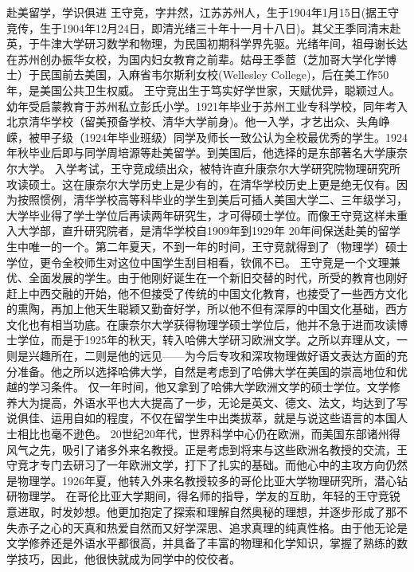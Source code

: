 赴美留学，学识俱进
王守竞，字井然，江苏苏州人，生于1904年1月15日(据王守竞传，生于1904年12月24日，即清光绪三十年十一月十八日)。其父王季同清末赴英，于牛津大学研习数学和物理，为民国初期科学界先驱。光绪年间，祖母谢长达在苏州创办振华女校，为国内妇女教育之前辈。姑母王季茝（芝加哥大学化学博士）于民国前去美国，入麻省韦尔斯利女校(Wellesley College)，后在美工作50年，是美国公共卫生权威。
王守竞出生于笃实好学世家，天赋优异，聪颖过人。幼年受启蒙教育于苏州私立彭氏小学。1921年毕业于苏州工业专科学校，同年考入北京清华学校（留美预备学校、清华大学前身)。他一入学，才艺出众、头角峥嵘，被甲子级（1924年毕业班级）同学及师长一致公认为全校最优秀的学生。1924年秋毕业后即与同学周培源等赴美留学。到美国后，他选择的是东部著名大学康奈尔大学。
入学考试，王守竞成绩出众，被特许直升康奈尔大学研究院物理研究所攻读硕士。这在康奈尔大学历史上是少有的，在清华学校历史上更是绝无仅有。因为按照惯例，清华学校高等科毕业的学生到美后可插人美国大学二、三年级学习，大学毕业得了学士学位后再读两年研究生，才可得硕士学位。而像王守竞这样未重入大学部，直升研究院者，是清华学校自1909年到1929年 20年间保送赴美的留学生中唯一的一个。第二年夏天，不到一年的时间，王守竞就得到了（物理学）硕士学位，更令全校师生对这位中国学生刮目相看，钦佩不已。
王守竞是一个文理兼优、全面发展的学生。由于他刚好诞生在一个新旧交替的时代，所受的教育也刚好赶上中西交融的开始，他不但接受了传统的中国文化教育，也接受了一些西方文化的熏陶，再加上他天生聪颖又勤奋好学，所以他不但有深厚的中国文化基础，西方文化也有相当功底。在康奈尔大学获得物理学硕士学位后，他并不急于进而攻读博士学位，而是于1925年的秋天，转入哈佛大学研习欧洲文学。之所以弃理从文，一则是兴趣所在，二则是他的远见——为今后专攻和深攻物理做好语文表达方面的充分准备。他之所以选择哈佛大学，自然是考虑到了哈佛大学在美国的崇高地位和优越的学习条件。
仅一年时间，他又拿到了哈佛大学欧洲文学的硕士学位。文学修养大为提高，外语水平也大大提高了一步，无论是英文、德文、法文，均达到了写说俱佳、运用自如的程度，不仅在留学生中出类拔萃，就是与说这些语言的本国人士相比也毫不逊色。
20世纪20年代，世界科学中心仍在欧洲，而美国东部诸州得风气之先，吸引了诸多外来名教授。正是考虑到将来与这些欧洲名教授的交流，王守竞才专门去研习了一年欧洲文学，打下了扎实的基础。而他心中的主攻方向仍然是物理学。1926年夏，他转入外来名教授较多的哥伦比亚大学物理研究所，潜心钻研物理学。
在哥伦比亚大学期间，得名师的指导，学友的互助，年轻的王守竞锐意进取，时发妙想。他更加抱定了探索和理解自然奥秘的理想，并逐步形成了那不失赤子之心的天真和热爱自然而又好学深思、追求真理的纯真性格。由于他无论是文学修养还是外语水平都很高，并具备了丰富的物理和化学知识，掌握了熟练的数学技巧，因此，他很快就成为同学中的佼佼者。
